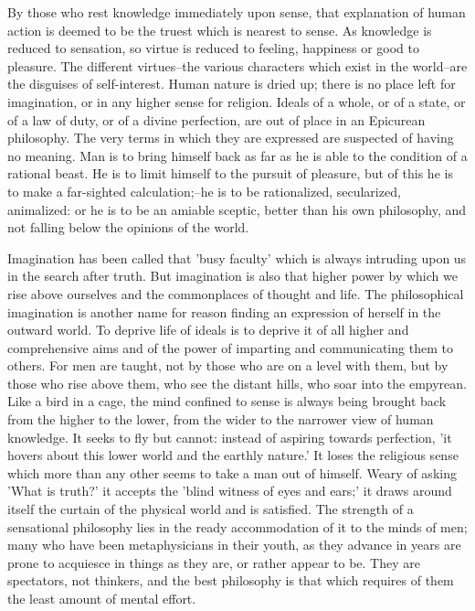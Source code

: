 By those who rest knowledge immediately upon sense, that explanation of
human action is deemed to be the truest which is nearest to sense. As
knowledge is reduced to sensation, so virtue is reduced to feeling,
happiness or good to pleasure. The different virtues--the various
characters which exist in the world--are the disguises of self-interest.
Human nature is dried up; there is no place left for imagination, or in
any higher sense for religion. Ideals of a whole, or of a state, or of a
law of duty, or of a divine perfection, are out of place in an Epicurean
philosophy. The very terms in which they are expressed are suspected of
having no meaning. Man is to bring himself back as far as he is able to
the condition of a rational beast. He is to limit himself to the pursuit
of pleasure, but of this he is to make a far-sighted calculation;--he is
to be rationalized, secularized, animalized: or he is to be an amiable
sceptic, better than his own philosophy, and not falling below the
opinions of the world.

Imagination has been called that 'busy faculty' which is always
intruding upon us in the search after truth. But imagination is also
that higher power by which we rise above ourselves and the commonplaces
of thought and life. The philosophical imagination is another name for
reason finding an expression of herself in the outward world. To deprive
life of ideals is to deprive it of all higher and comprehensive aims and
of the power of imparting and communicating them to others. For men are
taught, not by those who are on a level with them, but by those who rise
above them, who see the distant hills, who soar into the empyrean. Like
a bird in a cage, the mind confined to sense is always being brought
back from the higher to the lower, from the wider to the narrower view
of human knowledge. It seeks to fly but cannot: instead of aspiring
towards perfection, 'it hovers about this lower world and the earthly
nature.' It loses the religious sense which more than any other seems to
take a man out of himself. Weary of asking 'What is truth?' it accepts
the 'blind witness of eyes and ears;' it draws around itself the curtain
of the physical world and is satisfied. The strength of a sensational
philosophy lies in the ready accommodation of it to the minds of men;
many who have been metaphysicians in their youth, as they advance in
years are prone to acquiesce in things as they are, or rather appear to
be. They are spectators, not thinkers, and the best philosophy is that
which requires of them the least amount of mental effort.

